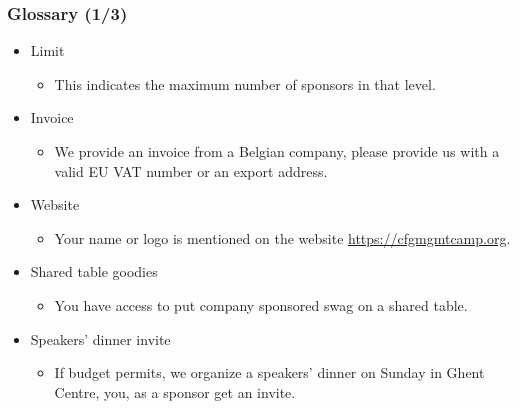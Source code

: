 \begin{frame}
\frametitle{Glossary (1/3)}
\begin{itemize}
	\item<+->
	Limit
	\begin{itemize}
		\item<+->
		This indicates the maximum number of sponsors in that level.
	\end{itemize}
	\item<+->
	Invoice
	\begin{itemize}
		\item<+->
		We provide an invoice from a Belgian company, please provide us with a valid EU VAT number or an export address.
	\end{itemize}
	\item<+->
	Website
	\begin{itemize}
		\item<+->
		Your name or logo is mentioned on the website \url{https://cfgmgmtcamp.org}.
	\end{itemize}
	\item<+->
	Shared table goodies
	\begin{itemize}
		\item<+->
		You have access to put company sponsored swag on a shared table.
	\end{itemize}
	\item<+->
	Speakers' dinner invite
	\begin{itemize}
		\item<+->
		If budget permits, we organize a speakers' dinner on Sunday in Ghent Centre, you, as a sponsor get an invite.
	\end{itemize}
\end{itemize}
\end{frame}

